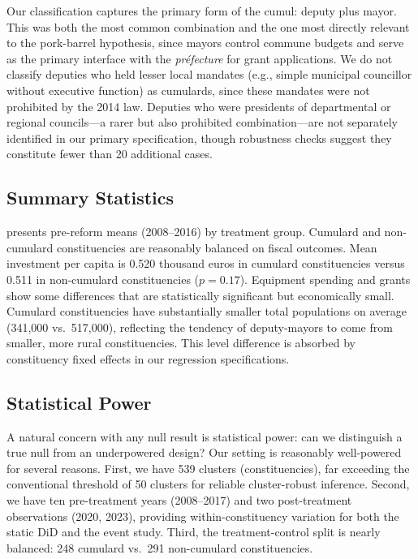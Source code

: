 \documentclass[12pt]{article}
\begin{document}
Our classification captures the primary form of the cumul: deputy plus mayor. This was both the most common combination and the one most directly relevant to the pork-barrel hypothesis, since mayors control commune budgets and serve as the primary interface with the \textit{préfecture} for grant applications. We do not classify deputies who held lesser local mandates (e.g., simple municipal councillor without executive function) as cumulards, since these mandates were not prohibited by the 2014 law. Deputies who were presidents of departmental or regional councils---a rarer but also prohibited combination---are not separately identified in our primary specification, though robustness checks suggest they constitute fewer than 20 additional cases.

\subsection{Summary Statistics}

 presents pre-reform means (2008--2016) by treatment group. Cumulard and non-cumulard constituencies are reasonably balanced on fiscal outcomes. Mean investment per capita is 0.520 thousand euros in cumulard constituencies versus 0.511 in non-cumulard constituencies ($p = 0.17$). Equipment spending and grants show some differences that are statistically significant but economically small. Cumulard constituencies have substantially smaller total populations on average (341,000 vs.\ 517,000), reflecting the tendency of deputy-mayors to come from smaller, more rural constituencies. This level difference is absorbed by constituency fixed effects in our regression specifications.



\subsection{Statistical Power}

A natural concern with any null result is statistical power: can we distinguish a true null from an underpowered design? Our setting is reasonably well-powered for several reasons. First, we have 539 clusters (constituencies), far exceeding the conventional threshold of 50 clusters for reliable cluster-robust inference. Second, we have ten pre-treatment years (2008--2017) and two post-treatment observations (2020, 2023), providing within-constituency variation for both the static DiD and the event study. Third, the treatment-control split is nearly balanced: 248 cumulard vs.\ 291 non-cumulard constituencies.
\end{document}
